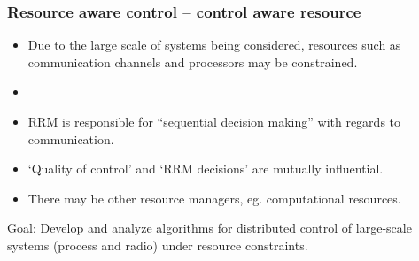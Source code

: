 \documentclass{beamer}
\begin{document}
\begin{frame}
 \frametitle{Resource aware control -- control aware resource}
 \begin{itemize}
  \item Due to the large scale of systems being considered, resources such as communication
  channels and processors may be constrained.
  \item[]
  \item RRM is responsible for ``sequential decision making'' with regards to communication.
  \item `Quality of control' and `RRM decisions' are mutually influential.
  \item There may be other resource managers, eg. computational resources.
 \end{itemize}
  \begin{block}
   {\color{violet} Goal: Develop and analyze algorithms for distributed control of large-scale
  systems (process and radio) under resource constraints.}
  \end{block}
\end{frame}
 
\end{document}
